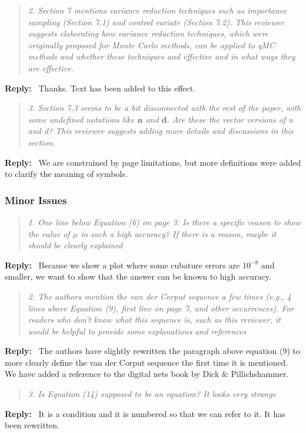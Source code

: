 \documentclass[11pt]{article}
\newenvironment{response}{%
  \vspace{1em}
  \begin{quote}\itshape
}{%
  \end{quote}
  \noindent\textbf{Reply:}~
}
\begin{document}
\begin{response}{2.}
    Section 7 mentions variance reduction techniques such as importance sampling (Section 7.1) and control variate (Section 7.2). This reviewer suggests elaborating how variance reduction techniques, which were originally proposed for Monte Carlo methods, can be applied to qMC methods and whether these techniques and effective and in what ways they are effective.
\end{response}
Thanks.  Text has been added to this effect.



\begin{response}{3.}
    Section 7.3 seems to be a bit disconnected with the rest of the paper, with some undefined notations like $\boldsymbol{n}$ and $\boldsymbol{d}$. Are these the vector versions of n and d? This reviewer suggests adding more details and discussions in this section.
\end{response}
We are constrained by page limitations, but more definitions were added to clarify the meaning of symbols.

\subsubsection*{Minor Issues}

\begin{response}{1.}
    One line below Equation (6) on page 3: Is there a specific reason to show the value of $\mu$ in such a high accuracy? If there is a reason, maybe it should be clearly explained
\end{response}
Because we show a plot where some cubature errors are $10^{-8}$ and smaller, we want to show that the answer can be known to high accuracy. 


\begin{response}{2.}
    The authors mention the van der Corput sequence a few times (e.g., 4 lines above Equation (9), first line on page 7, and other occurrences). For readers who don’t know what this sequence is, such as this reviewer, it would be helpful to provide some explanations and references
\end{response}
The authors have slightly rewritten the paragraph above equation (9) to more clearly define the van der Corput sequence the first time it is mentioned.  We have added a reference to the digital nets book by Dick \& Pillichshammer.


\begin{response}{3.}
    Is Equation (14) supposed to be an equation? It looks very strange
\end{response}
It is a condition and it is numbered so that we can refer to it.  It has been rewritten.
\end{document}

